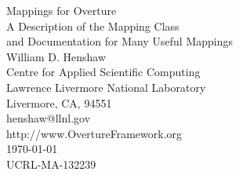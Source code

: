 \documentclass[xcolor=rgb,svgnames,dvipsnames]{article}
\begin{document}


\def\uvd    {{\bf U}}
\def\ud     {{    U}}
\def\pd     {{    P}}
\def\id     {i}
\def\jd     {j}
\def\kap {\sqrt{s+\omega^2}}

\newcommand{\mapping}{\homeHenshaw/Overture/mapping}
\newcommand{\figures}{\homeHenshaw/OvertureFigures}

\vspace{3\baselineskip}
\begin{flushleft}
  {\Large 
   Mappings for Overture  \\ 
   A Description of the Mapping Class  \\
   and Documentation for Many Useful Mappings \\
  }
\vspace{2\baselineskip}
William D. Henshaw      \\         
Centre for Applied Scientific Computing \\
Lawrence Livermore National Laboratory    \\
Livermore, CA, 94551   \\
henshaw@llnl.gov \\
http://www.OvertureFramework.org\\
\vspace{1\baselineskip}
\today \\
\vspace{\baselineskip}
UCRL-MA-132239

\end{flushleft}

\vspace{1\baselineskip}
\end{document}

